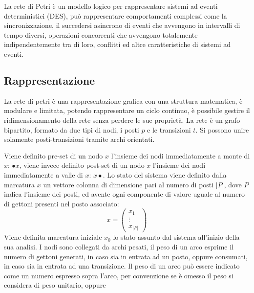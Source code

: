 \documentclass{article}
\numberwithin{equation}{subsection}
\begin{document}
La rete di Petri è un modello logico per rappresentare sistemi ad eventi deterministici (DES), può rappresentare comportamenti complessi come la sincronizzazione, il succedersi 
asincrono di eventi che avvengono in intervalli di tempo diversi, operazioni concorrenti che avvengono totalemente indipendentemente tra di loro, conflitti ed altre 
caratteristiche di sistemi ad eventi. 

\subsection{Rappresentazione}

La rete di petri è una rappresentazione grafica con una struttura matematica, è modulare e limitata, potendo rappresentare un ciclo continuo, è possibile gestire il ridimensionamento 
della rete senza perdere le sue proprietà. La rete è un grafo bipartito, formato da due tipi di nodi, i posti $p$ e le transizioni $t$. Si possono unire solamente posti-transizioni 
tramite archi orientati. 
\begin{center}
\end{center}
Viene definito pre-set di un nodo $x$ l'insieme dei nodi immediatamente a monte di $x$: $\bullet x$, viene invece definito post-set di un nodo $x$ l'insieme dei nodi 
immediatamente a valle di $x$: $x\bullet$. Lo stato del sistema viene definito dalla marcatura $x$ un vettore colonna di dimensione pari al numero di posti $|P|$, dove $P$ 
indica l'insieme dei posti, ed avente ogni componente di valore uguale al numero di gettoni presenti nel posto associato:
\begin{equation*}
    x=\begin{pmatrix}
        x_1\\
        \vdots\\
        x_{|P|}
    \end{pmatrix}
\end{equation*}
Viene definita marcatura iniziale $x_0$ lo stato assunto dal sistema all'inizio della sua analisi. 
I nodi sono collegati da archi pesati, il peso di un arco esprime il numero di gettoni generati, in caso sia in entrata ad un posto, oppure consumati, in caso sia in entrata 
ad una transizione. Il peso di un arco può essere indicato come un numero espresso sopra l'arco, per convenzione se è omesso il peso si considera di peso unitario, oppure 
\end{document}
